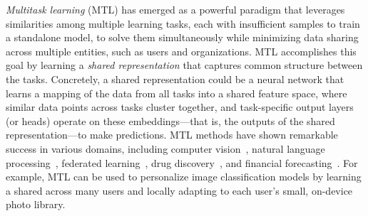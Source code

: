 \emph{Multitask learning} (MTL) has emerged as a powerful paradigm that leverages similarities among multiple learning tasks, each with insufficient samples to train a standalone model, to solve them simultaneously while minimizing data sharing across multiple entities, such as users and organizations.
MTL accomplishes this goal by learning a \emph{shared representation} that captures common structure between the tasks. Concretely, a shared representation could be a neural network that learns a mapping of the data from all tasks into a shared feature space, where similar data points across tasks cluster together, and task-specific output layers (or heads) operate on these embeddings—that is, the outputs of the shared representation—to make predictions. MTL methods have shown remarkable success in various domains, including computer vision~\cite{girshick2015fastrcnn}, natural language processing~\cite{collobert2008multitasklanguage}, federated learning~\cite{smith2017federated, hanzely2021federatedmixture, mansour2020personalization, ghosh2020clusteredfederated}, drug discovery~\cite{ramsundar2015drugdiscovery}, and financial forecasting~\cite{ghosn1996finance}. For example, MTL can be used to personalize image classification models by learning a shared across many users and locally adapting to each user's small, on-device photo library.



